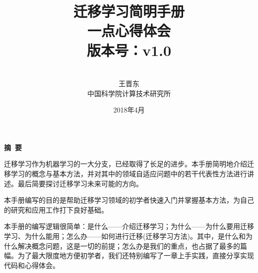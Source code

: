 \documentclass[a4paper]{article}
\begin{document}
\pagestyle{main}    %

\renewcommand{\refname}{参考文献} 
\renewcommand{\figurename}{图}
\renewcommand{\tablename}{表}
\renewcommand{\contentsname}{目录}
\renewcommand{\today}{\number\year 年 \number\month 月 \number\day 日}
\makeatletter

\renewcommand\tableofcontents{%
	\begin{multicols}{2}[%
		\section*{%
			\contentsname
			\@mkboth{\MakeUppercase\contentsname}{\MakeUppercase\contentsname}}]%
		\@starttoc{toc}%
\end{multicols}}
\makeatother


\title{{\Huge 迁移学习简明手册{\large\linebreak\\}}{\Large 一点心得体会\\版本号：v1.0\linebreak\linebreak
}}
\author{\\
	王晋东\\中国科学院计算技术研究所}
\date{2018年4月}
\maketitle
\thispagestyle{empty}

\newpage

\thispagestyle{empty}
\begin{center}
{\Large\bf{摘\ 要\\}}
\end{center}
迁移学习作为机器学习的一大分支，已经取得了长足的进步。本手册简明地介绍迁移学习的概念与基本方法，并对其中的领域自适应问题中的若干代表性方法进行讲述。最后简要探讨迁移学习未来可能的方向。

本手册编写的目的是帮助迁移学习领域的初学者快速入门并掌握基本方法，为自己的研究和应用工作打下良好基础。

本手册的编写逻辑很简单：是什么——介绍迁移学习；为什么——为什么要用迁移学习、为什么能用；怎么办——如何进行迁移(迁移学习方法)。其中，是什么和为什么解决概念问题，这是一切的前提；怎么办是我们的重点，也占据了最多的篇幅。为了最大限度地方便初学者，我们还特别编写了一章上手实践，直接分享实现代码和心得体会。
\newpage
\end{document}
